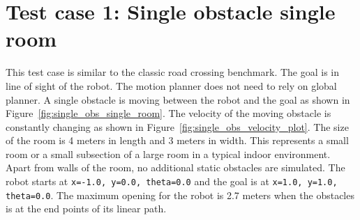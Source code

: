 \section{Test case 1: Single obstacle single room}%
\label{sec:test_case_1_single_obstacle_single_room}
    This test case is similar to the classic road crossing benchmark\cite{van2008reciprocal}. The goal 
    is in line of sight of the robot. The motion planner does not need to rely on 
    global planner. A single obstacle is moving between the robot and the goal as shown in 
    Figure~\ref{fig:single_obs_single_room}. The velocity of the moving obstacle is constantly changing as shown in 
    Figure~\ref{fig:single_obs_velocity_plot}. The size of the room is 4 meters in length and 3 
    meters in width. This represents a small room or a small subsection of a large room in a 
    typical indoor environment. Apart from walls of the room, no additional static obstacles are
    simulated. The robot starts at \texttt{x=-1.0, y=0.0, theta=0.0} and the goal is at \texttt{x=1.0, y=1.0, theta=0.0}.
    The maximum opening for the robot is 2.7 meters when the obstacles is at the 
    end points of its linear path. 
